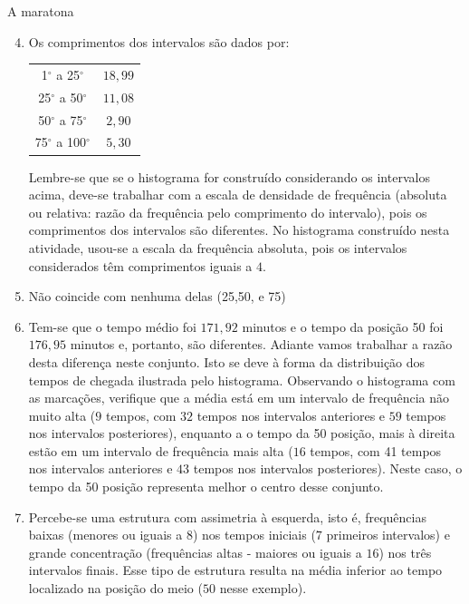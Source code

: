 \begin{answer}{A maratona}
{
	\begin{enumerate}\setcounter{enumi}{3}
	\item Os comprimentos dos intervalos são dados por:
	\begin{table}[H]
	\centering
	\begin{tabular}{|c|c|}
	\hline
	\tcolor{Intervalo} & \tcolor{Comprimento} \\
	\hline
	1$^{\circ}$ a 25$^{\circ}$ & $18{,}99$ \\
	\hline
	25$^{\circ}$ a 50$^{\circ}$ & $11{,}08$ \\
	\hline
	50$^{\circ}$ a 75$^{\circ}$ & $2{,}90$ \\
	\hline
	75$^{\circ}$ a 100$^{\circ}$ & $5{,}30$ \\
	\hline
	\end{tabular}
	\end{table}

	Lembre-se que se o histograma for construído considerando os intervalos acima, deve-se trabalhar com a escala de densidade de frequência (absoluta ou relativa: razão da frequência pelo comprimento do intervalo), pois os comprimentos dos intervalos são diferentes. No histograma construído nesta atividade, usou-se a escala da frequência absoluta, pois os intervalos considerados têm comprimentos iguais a $4$.
	\item Não coincide com nenhuma delas (25,50, e 75)

	\item Tem-se que o tempo médio foi $171{,}92$ minutos e o tempo da posição 50 foi $176{,}95$ minutos e, portanto, são diferentes. Adiante vamos trabalhar a razão desta diferença neste conjunto. Isto se deve à forma da distribuição dos tempos de chegada ilustrada pelo histograma. Observando o histograma com as marcações, verifique que a média está em um intervalo de frequência não muito alta ($9$ tempos, com $32$ tempos nos intervalos anteriores e $59$ tempos nos intervalos posteriores), enquanto a o tempo da 50 posição, mais à direita estão em um intervalo de frequência mais alta ($16$ tempos, com 41 tempos nos intervalos anteriores e $43$ tempos nos intervalos posteriores). Neste caso, o tempo da 50 posição representa melhor o centro desse conjunto.

	\item Percebe-se uma estrutura com assimetria à esquerda, isto é, frequências baixas (menores ou iguais a 8) nos tempos iniciais ($7$ primeiros intervalos) e grande concentração (frequências altas - maiores ou iguais a $16$) nos três intervalos finais. Esse tipo de estrutura resulta na média inferior ao tempo localizado na posição do meio ($50$ nesse exemplo).


\end{enumerate}}
\end{answer}
